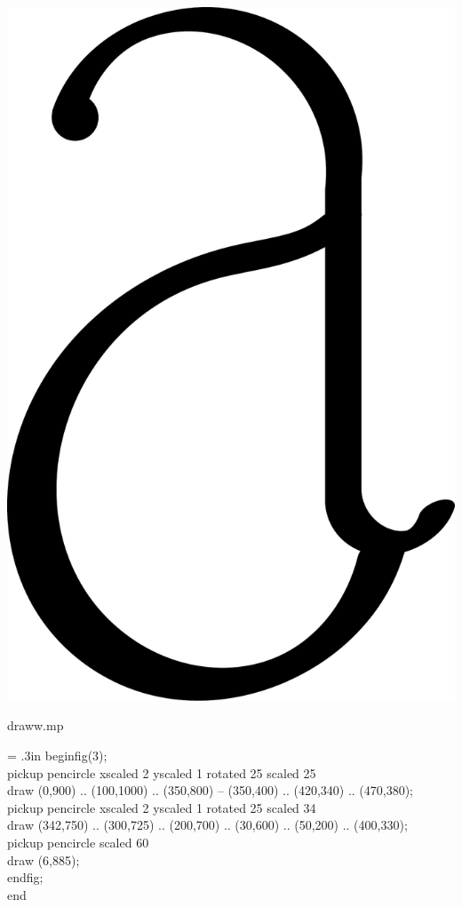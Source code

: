 \documentclass[danish,a2paper,22pt]{scrartcl}
\begin{document}
\begin{multicols*}{3}
\begin{spacing}{0.5}
\center
\includegraphics[scale=.25]{draww-3.pdf}
\vspace{-1cm}

\flushleft
\color{White}
\romansmall
draww.mp\\
\vspace{.4cm}
\color{Black}
\typewritersmall
{\leftskip = .3in
beginfig(3);\\
pickup pencircle xscaled 2 yscaled 1 rotated 25 scaled 25\\
draw (0,900) .. (100,1000) .. (350,800) -- (350,400) .. (420,340) .. (470,380);\\
pickup pencircle xscaled 2 yscaled 1 rotated 25 scaled 34\\
draw (342,750) .. (300,725) .. (200,700) .. (30,600) .. (50,200) .. (400,330);\\
pickup pencircle scaled 60\\
draw (6,885);\\
endfig;\\
end
\par}



\end{spacing}
\end{multicols*}
\end{document}
